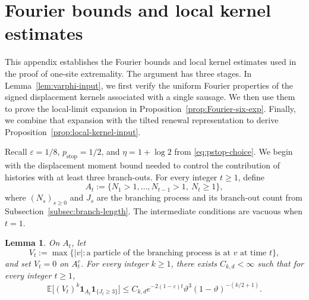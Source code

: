 \documentclass[letterpaper,11pt,reqno]{amsart}
\newtheorem{lemma}[thm]{Lemma}
\theoremstyle{definition}
\begin{document}
\medskip





\appendix
\section{Fourier bounds and local kernel estimates}\label{sec:appendix}
This appendix establishes the Fourier bounds and local kernel estimates used in the proof of one-site extremality.
%
The argument has three stages. In Lemma~\ref{lem:varphi-input}, we first verify the uniform Fourier properties of the signed displacement kernels associated with a single sausage. We then use them to prove the local-limit expansion in Proposition~\ref{prop:Fourier-six-exp}. Finally, we combine that expansion with the tilted renewal representation to derive
Proposition~\ref{prop:local-kernel-input}.

Recall \(\varepsilon=1/8\), \(p_{\mathrm{stop}}=1/2\), and
\(\eta=1+\log 2\) from \eqref{eq:pstop-choice}.
%
We begin with the displacement moment bound needed to control the contribution of histories with
at least three branch-outs.
For every integer \(t\ge1\), define
\[
A_t
:=
\{N_1>1,\ldots,N_{t-1}>1,\ N_t\geq1\},
\]
where \((N_s)_{s\ge0}\) and \(J_s\) are the branching process and its branch-out count from
Subsection~\ref{subsec:branch-length}. The intermediate conditions are vacuous when \(t=1\).



\begin{lemma}\label{lem:zt_bound}
On \(A_t\), let
\[
V_t
:=
\max\bigl\{|v|:\text{a particle of the branching process is at }v
\text{ at time }t\bigr\},
\]
and set \(V_t=0\) on \(A_t^c\).
For every integer \(k\ge1\), there exists \(C_{k,d}<\infty\) such that for every integer \(t\ge1\),
\[
\mathbb E\bigl[(V_t)^k\mathbf 1_{A_t}\mathbf 1_{\{J_t\ge3\}}\bigr]
\le
C_{k,d}e^{-2(1-\varepsilon)t}\vartheta^3(1-\vartheta)^{-(k/2+1)}.
\]
\end{lemma}
\end{document}
